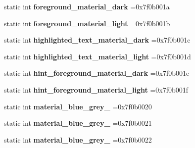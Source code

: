 \begin{DoxyCompactItemize}
static int {\bfseries foreground\+\_\+material\+\_\+dark} =0x7f0b001a
\item 
\mbox{\label{classandroid_1_1support_1_1design_1_1R_1_1color_a2e96b3cc5e4e1272eebb7a5d80cbfd25}} 
static int {\bfseries foreground\+\_\+material\+\_\+light} =0x7f0b001b
\item 
\mbox{\label{classandroid_1_1support_1_1design_1_1R_1_1color_a1c309cf4d70c1ff4c95231a30b311568}} 
static int {\bfseries highlighted\+\_\+text\+\_\+material\+\_\+dark} =0x7f0b001c
\item 
\mbox{\label{classandroid_1_1support_1_1design_1_1R_1_1color_ac9f74b115acec6358b3929283635f387}} 
static int {\bfseries highlighted\+\_\+text\+\_\+material\+\_\+light} =0x7f0b001d
\item 
\mbox{\label{classandroid_1_1support_1_1design_1_1R_1_1color_a6e64fe923eef56db3da27b501e78e4d7}} 
static int {\bfseries hint\+\_\+foreground\+\_\+material\+\_\+dark} =0x7f0b001e
\item 
\mbox{\label{classandroid_1_1support_1_1design_1_1R_1_1color_a88bed31ba78c0aa52c5f18cd51385b91}} 
static int {\bfseries hint\+\_\+foreground\+\_\+material\+\_\+light} =0x7f0b001f
\item 
\mbox{\label{classandroid_1_1support_1_1design_1_1R_1_1color_acf936b8d46c91ca41dd245a155cb023a}} 
static int {\bfseries material\+\_\+blue\+\_\+grey\+\_} =0x7f0b0020
\item 
\mbox{\label{classandroid_1_1support_1_1design_1_1R_1_1color_a163507032e5057f909f11d7801a1c92f}} 
static int {\bfseries material\+\_\+blue\+\_\+grey\+\_} =0x7f0b0021
\item 
\mbox{\label{classandroid_1_1support_1_1design_1_1R_1_1color_afbd46081d5d4af2ef793de2a0d624b06}} 
static int {\bfseries material\+\_\+blue\+\_\+grey\+\_} =0x7f0b0022

\end{DoxyCompactItemize}
